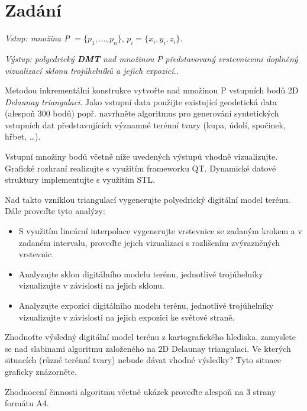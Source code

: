 \chapter*{Zadání}

\par \emph {Vstup: množina P} $= \{p_1, \dots, p_n\}$, $p_i = \{x_i, y_i, z_i\}$.
\par \emph {Výstup: polyedrický \textbf{DMT} nad množinou $P$ představovaný vrstevnicemi doplněný vizualizací sklonu trojúhelníků a jejich expozicí.}.

\par Metodou inkrementální konstrukce vytvořte nad množinou P vstupních bodů 2D \emph{Delaunay triangulaci}. Jako vstupní data použijte existující geodetická data (alespoň 300 bodů) popř. navrhněte algoritmus pro generování syntetických vstupních dat představujících významné terénní tvary (kupa, údolí, spočinek, hřbet, \dots).

\par Vstupní množiny bodů včetně níže uvedených výstupů vhodně vizualizujte. Grafické rozhraní realizujte s využitím frameworku QT. Dynamické datové struktury implementujte s využitím STL.

\par Nad takto vzniklou triangulací vygenerujte polyedrický digitální model terénu. Dále proveďte tyto analýzy:

\begin{itemize}
  \item S využitím lineární interpolace vygenerujte vrstevnice se zadaným krokem a v zadaném intervalu, proveďte jejich vizualizaci s rozlišením zvýrazněných vrstevnic.
  \item Analyzujte sklon digitálního modelu terénu, jednotlivé trojúhelníky vizualizujte v závislosti na jejich sklonu.
  \item Analyzujte expozici digitálního modelu terénu, jednotlivé trojúhelníky vizualizujte v závislosti na jejich expozici ke světové straně.
\end{itemize}

\par Zhodnoťte výsledný digitální model terénu z kartografického hlediska, zamyslete se nad slabinami algoritmu založeného na 2D Delaunay triangulaci. Ve kterých situacích (různé terénní tvary) nebude dávat vhodné výsledky? Tyto situace graficky znázorněte.

\par Zhodnocení činnosti algoritmu včetně ukázek proveďte alespoň na 3 strany formátu A4.
\bigbreak

